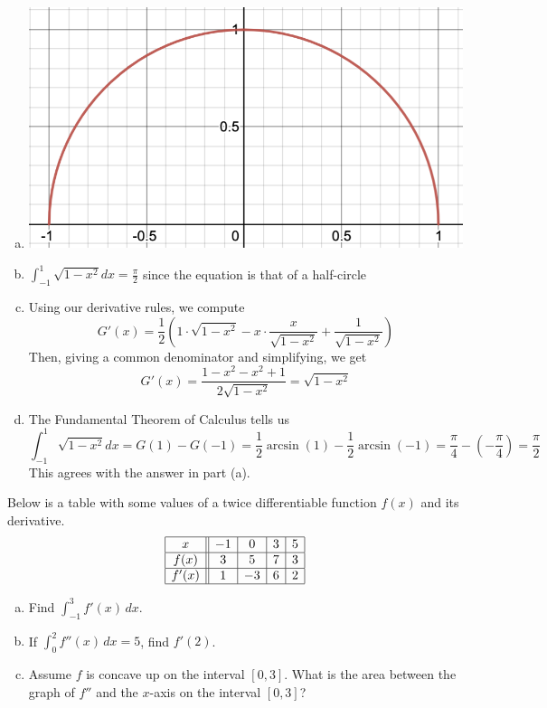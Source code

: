 \documentclass[11pt]{exam}
\begin{document}
\begin{questions}
\begin{solution}
  \begin{enumerate}[(a)]
  \item \includegraphics[scale=0.5]{Figures/half-circle-graph}
  \item \(\int_{-1}^1 \sqrt{1-x^2} dx = \frac{\pi}{2}\) since the
    equation is that of a half-circle
  \item Using our derivative rules, we compute \[
      G'(x) = \frac{1}{2}\left( 1 \cdot \sqrt{1-x^2} - 
        x \cdot \frac{x}{\sqrt{1-x^2}} + \frac{1}{\sqrt{1-x^2}} \right) 
    \]
    Then, giving a common denominator and simplifying, we get \[
      G'(x) = \frac{1-x^2-x^2+1}{2 \sqrt{1-x^2}} = \sqrt{1-x^2}
    \]
  \item The Fundamental Theorem of Calculus tells us \[
      \int_{-1}^1 \sqrt{1-x^2} dx = G(1) - G(-1) = \frac{1}{2}\arcsin(1) -
      \frac{1}{2}\arcsin(-1) = \frac{\pi}{4} - \left( -\frac{\pi}{4}
      \right) = \frac{\pi}{2}
    \]
    This agrees with the answer in part (a).
  \end{enumerate}
\end{solution}
\question Below is a table with some values of a twice differentiable function $f(x)$	and its derivative.
	$$\begin{array}{|c||c|c|c|c|}
	\hline
	x & -1 & 0 & 3 & 5 \\
	\hline
	f(x) & 3 & 5 & 7 & 3 \\
	\hline
	f'(x) & 1 & -3 & 6 & 2\\
	\hline	
	\end{array}$$
\begin{enumerate}[(a)]
	\item Find $\displaystyle\int_{-1}^3 f'(x) \, dx$.
	\item If $\displaystyle\int_{0}^2 f''(x) \, dx = 5$, find $f'(2)$.
	\item Assume $f$ is concave up on the interval $[0,3]$. What is the area between the graph of $f''$ and the $x$-axis on the interval $[0,3]$?

\end{enumerate}
\end{questions}
\end{document}
